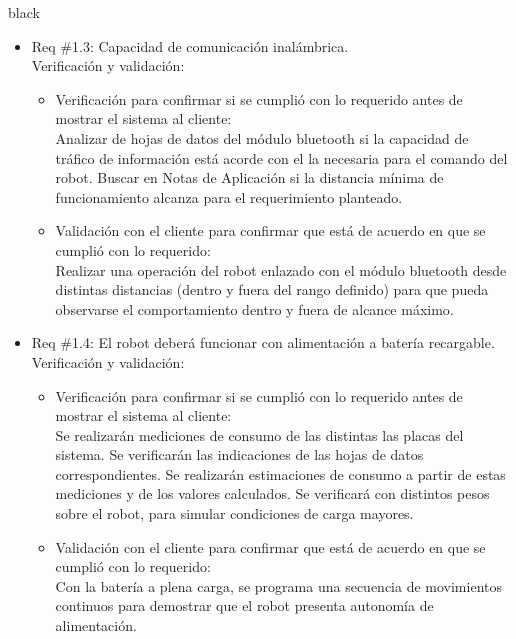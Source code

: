 \documentclass[11pt]{charter}
\begin{document}
\begin{consigna}{black}
\begin{itemize}
\item Req \#1.3: Capacidad de comunicación inalámbrica.\\
Verificación y validación:
\begin{itemize}
\item Verificación para confirmar si se cumplió con lo requerido antes de mostrar el
sistema al cliente:\\
Analizar de hojas de datos del módulo bluetooth si la capacidad de tráfico de información está acorde con el la necesaria para el comando del robot. Buscar en Notas de Aplicación si la distancia mínima de funcionamiento alcanza para el requerimiento planteado. \\
\item Validación con el cliente para confirmar que está de acuerdo en que se cumplió con lo requerido:\\ 
Realizar una operación del robot enlazado con el módulo bluetooth desde distintas distancias (dentro y fuera del rango definido) para que pueda observarse el comportamiento dentro y fuera de alcance máximo.\\
\end{itemize}

\item Req \#1.4: El robot deberá funcionar con alimentación a batería recargable.\\
Verificación y validación:
\begin{itemize}
\item Verificación para confirmar si se cumplió con lo requerido antes de mostrar el
sistema al cliente:\\
Se realizarán mediciones de consumo de las distintas las placas del sistema. Se verificarán las indicaciones de las hojas de
datos correspondientes. Se realizarán estimaciones de consumo a partir de estas mediciones y de los valores calculados. Se verificará con distintos pesos sobre el robot, para simular condiciones de carga mayores.\\
\item Validación con el cliente para confirmar que está de acuerdo en que se cumplió con lo requerido:\\ 
Con la batería a plena carga, se programa una secuencia de movimientos continuos para demostrar que el robot presenta autonomía de alimentación.\\
\end{itemize}


\end{itemize}
\end{consigna}
\end{document}
